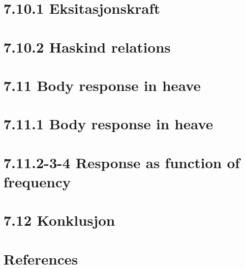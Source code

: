 \section{7.10.1 Eksitasjonskraft }
\section{7.10.2 Haskind relations}
\section{7.11 Body response in heave}
\section{7.11.1 Body response in heave}
\section{7.11.2-3-4 Response as function of frequency}
\section{7.12 Konklusjon }
\section{References}
